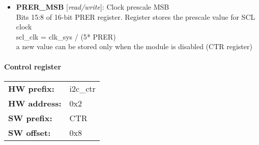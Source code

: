 \vspace{12pt}
\noindent
{}

\begin{itemize}
\item \begin{small}
{\bf 
PRER\_MSB
} [\emph{read/write}]: Clock prescale MSB
\\
Bits 15:8 of 16-bit PRER register. Register stores the prescale value for SCL clock \\                      scl\_clk = clk\_sys / (5* PRER) \\                      a new value can be stored only when the module is disabled (CTR register)
\end{small}
\end{itemize}
\paragraph*{Control register}\vspace{12pt}

\begin{tabular}{l l }
{\bf HW prefix:}  & i2c\_ctr\\
{\bf HW address:}  & 0x2\\
{\bf SW prefix:}  & CTR\\
{\bf SW offset:}  & 0x8\\
\end{tabular}



